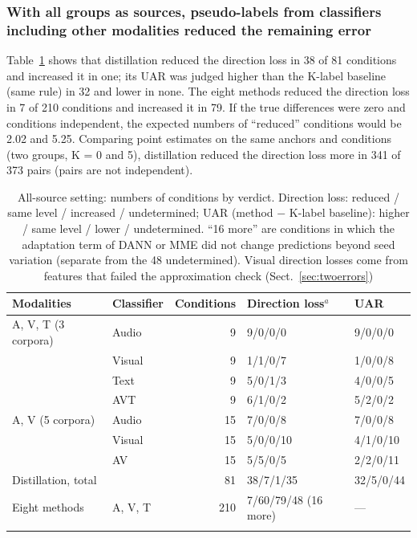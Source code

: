 \subsubsection{With all groups as sources, pseudo-labels from classifiers including other modalities reduced the remaining error}
Table~\ref{tab:allsource} shows that distillation reduced the direction loss in 38 of 81 conditions and increased it in one; its UAR was judged higher than the K-label baseline (same rule) in 32 and lower in none. The eight methods reduced the direction loss in 7 of 210 conditions and increased it in 79. If the true differences were zero and conditions independent, the expected numbers of ``reduced'' conditions would be 2.02 and 5.25. Comparing point estimates on the same anchors and conditions (two groups, K = 0 and 5), distillation reduced the direction loss more in 341 of 373 pairs (pairs are not independent).

\begin{table}[t]
\caption{All-source setting: numbers of conditions by verdict. Direction loss: reduced / same level / increased / undetermined; UAR (method $-$ K-label baseline): higher / same level / lower / undetermined. ``16 more'' are conditions in which the adaptation term of DANN or MME did not change predictions beyond seed variation (separate from the 48 undetermined). Visual direction losses come from features that failed the approximation check (Sect.~\ref{sec:twoerrors})}\label{tab:allsource}
\footnotesize
\begin{tabular}{@{}llrll@{}}
\toprule
Modalities & Classifier & Conditions & Direction loss$^{a}$ & UAR \\
\midrule
A, V, T (3 corpora) & Audio & 9 & 9/0/0/0 & 9/0/0/0 \\
 & Visual & 9 & 1/1/0/7 & 1/0/0/8 \\
 & Text & 9 & 5/0/1/3 & 4/0/0/5 \\
 & AVT & 9 & 6/1/0/2 & 5/2/0/2 \\
A, V (5 corpora) & Audio & 15 & 7/0/0/8 & 7/0/0/8 \\
 & Visual & 15 & 5/0/0/10 & 4/1/0/10 \\
 & AV & 15 & 5/5/0/5 & 2/2/0/11 \\
\midrule
Distillation, total & & 81 & 38/7/1/35 & 32/5/0/44 \\
Eight methods & A, V, T & 210 & 7/60/79/48 (16 more) & --- \\
\botrule
\end{tabular}
\end{table}

